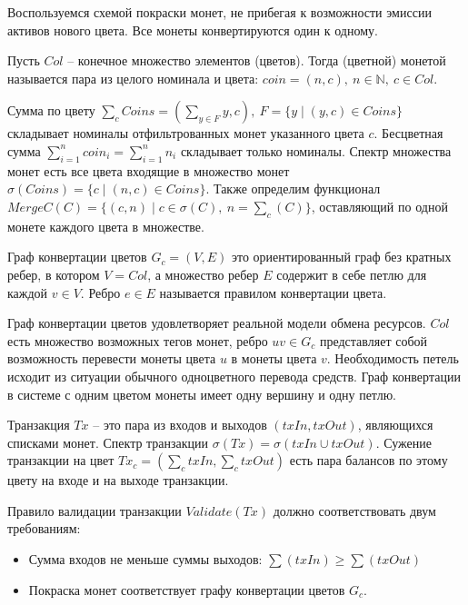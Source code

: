 \documentclass[specification,annotation]{itmo-student-thesis}
\begin{document}
Воспользуемся схемой покраски монет, не прибегая к возможности эмиссии
активов нового цвета. Все монеты конвертируются один к одному.

\begin{definition}
Пусть $Col$ -- конечное множество элементов (цветов). Тогда (цветной)
монетой называется пара из целого номинала и цвета: $coin = (n,c), \ n
\in \mathbb{N}, \ c \in Col$.
\end{definition}

Сумма по цвету $\sum_c{Coins} = (\sum_{y \in F}{y}, c), \ F = \{y \mid
(y,c) \in Coins\}$ складывает номиналы отфильтрованных монет
указанного цвета $c$. Бесцветная сумма $\sum_{i=1}^n{coin_i} =
\sum_{i=1}^n{n_i}$ складывает только номиналы. Спектр множества монет
есть все цвета входящие в множество монет $\sigma(Coins) = \{c \mid
(n,c) \in Coins\}$. Также определим функционал $MergeC(C) = \{(c,n)
\mid c \in \sigma(C), \ n = \sum_c(C)\}$, оставляющий по одной монете
каждого цвета в множестве.

\begin{definition}
Граф конвертации цветов $G_c = (V,E)$ это ориентированный граф без
кратных ребер, в котором $V = Col$, а множество ребер $E$ содержит в
себе петлю для каждой $v \in V$. Ребро $e \in E$ называется правилом
конвертации цвета.
\end{definition}

Граф конвертации цветов удовлетворяет реальной модели обмена
ресурсов. $Col$ есть множество возможных тегов монет, ребро $uv \in
G_c$ представляет собой возможность перевести монеты цвета $u$ в
монеты цвета $v$. Необходимость петель исходит из ситуации обычного
одноцветного перевода средств. Граф конвертации в системе с одним
цветом монеты имеет одну вершину и одну петлю.

\begin{definition}
Транзакция $Tx$ -- это пара из входов и выходов $(txIn, txOut)$,
являющихся списками монет. Спектр транзакции $\sigma(Tx) = \sigma(txIn
\cup txOut)$. Сужение транзакции на цвет $Tx_c = (\sum_c{txIn},
\sum_c{txOut})$ есть пара балансов по этому цвету на входе и на выходе
транзакции.
\end{definition}

Правило валидации транзакции $Validate(Tx)$ должно соответствовать
двум требованиям:
\begin{itemize}
\item Сумма входов не меньше суммы выходов: $\sum(txIn) \geq \sum(txOut)$
\item Покраска монет соответствует графу конвертации цветов $G_c$.
\end{itemize}
\end{document}

